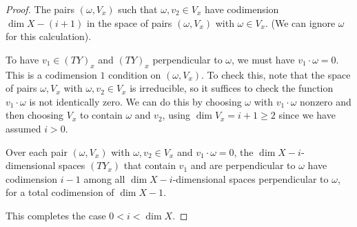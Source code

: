 \begin{proof}



The pairs  $(\omega,  V_x)$ such that $\omega, v_2 \in V_x$ have codimension $\dim X - (i+1)$ in the space of pairs $(\omega, V_x)$ with $ \omega \in V_x$. (We can ignore $\omega$ for this calculation).

To have $v_1 \in (TY)_x$ and $(TY)_x$ perpendicular to $\omega$, we must have $v_1 \cdot \omega =0$. This is a codimension $1$ condition on $(\omega, V_x)$. To check this, note that the space of pairs $\omega, V_x$ with  $\omega, v_2 \in V_x$ is irreducible, so it suffices to check the function $v_1 \cdot \omega$ is not identically zero. We can do this by choosing $\omega$ with $v_1 \cdot \omega$ nonzero and then choosing $V_x$ to contain $\omega$ and $v_2$, using $\dim V_x= i+1 \geq 2$ since we have assumed $i>0$.


Over each pair $(\omega, V_x)$ with  $\omega, v_2 \in V_x$ and $v_1 \cdot \omega = 0$,  the $\dim X-i$-dimensional spaces $(TY_x)$ that contain $v_1$ and are perpendicular to $\omega$ have codimension $i-1$ among all $\dim X-i$-dimensional spaces perpendicular to $\omega$, for a total codimension of $\dim X - 1$.

This completes the case $0 < i < \dim X$.





%


\end{proof}
